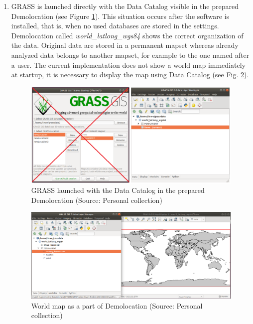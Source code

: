 \documentclass[a4paper,10pt,twoside]{article}
\begin{document}
\begin{enumerate}

\item GRASS is launched directly with the Data Catalog visible in the prepared Demolocation (see Figure \ref{fig:demolocation_startup}). This situation occurs after the software is installed, that is, when no used databases are stored in the settings. Demolocation called \textit{world\_latlong\_wgs84} shows the correct organization of the data. Original data are stored in a permanent mapset whereas already analyzed data belongs to another mapset, for example to the one named after a user. The current implementation does not show a world map immediately at startup, it is necessary to display the map using Data Catalog (see Fig. \ref{fig:demolocation}).

\begin{figure}[hbt!] 
\begin{center}
\includegraphics[width=17cm]{../pictures/demolocation_startup.png} 
\caption[GRASS launched with the Data Catalog in the prepared Demolocation]{GRASS launched with the Data Catalog in the prepared Demolocation (Source: Personal collection)}
\label{fig:demolocation_startup}
\end{center}
\end{figure}

\begin{figure}[hbt!] 
\begin{center}
\includegraphics[width=16.5cm]{../pictures/demolocation.png} 
\caption[World map as a part of Demolocation]{World map as a part of Demolocation (Source: Personal collection)}
\label{fig:demolocation}
\end{center}
\end{figure}


\end{enumerate}
\end{document}
